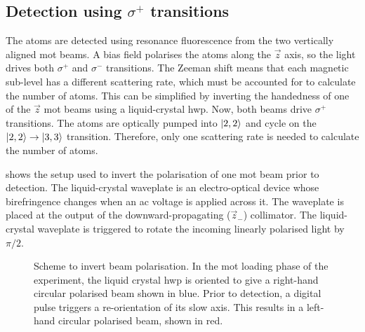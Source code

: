 \subsection{Detection using \(\sigma^+\) transitions}\label{subsec:photodiode_setup}
The atoms are detected using resonance fluorescence from the two
vertically aligned \ac{mot} beams. A bias field polarises the atoms
along the
\(\vec{z}\) axis, so the light drives both \(\sigma^+\) and
\(\sigma^-\)
transitions. The Zeeman shift means that each magnetic sub-level has a different scattering rate, which
must be accounted for to calculate the number of atoms. This can be
simplified by inverting the handedness of
one of the \(\vec{z}\) \ac{mot} beams using a liquid-crystal
\ac{hwp}. Now, both beams drive \(\sigma^+\) transitions. The
atoms are optically pumped into \(\ket{2,2}\) and cycle on the
\(\ket{2,2} \rightarrow \ket{3,3}\) transition. Therefore, only one
scattering rate is needed to calculate the number of atoms. 
\par\noindent
{} shows the setup used to invert the
polarisation of one \ac{mot} beam prior to detection. The liquid-crystal
waveplate is an electro-optical device whose birefringence changes
when an ac voltage is applied across it. The waveplate is placed at
the output of the downward-propagating (\(\vec{z}_-\))
collimator. The liquid-crystal waveplate is triggered to rotate the
incoming linearly polarised light by $\pi/2$\sivalue{}{\radian}. 
\begin{figure}[!htpb]
    \centering
    \fontsize{14pt}{14pt}
    \resizebox{0.5\textwidth}{!}{}
    \caption[Scheme to invert beam polarisation.]{Scheme to invert
      beam polarisation. In the \ac{mot} loading phase of the
      experiment, the liquid crystal \ac{hwp} is oriented to give a
      right-hand circular polarised beam shown in blue. Prior to
      detection, a digital pulse triggers a re-orientation of its slow
      axis. This results in a left-hand circular polarised beam, shown
      in red.}\label{fig:detection_scheme}
\end{figure}
